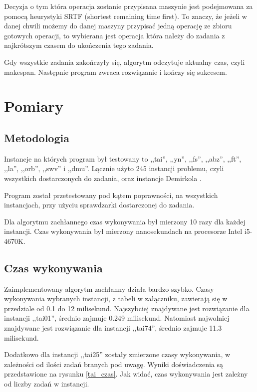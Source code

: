 \documentclass[11pt,twocolumn]{article}
\begin{document}
Decyzja o tym która operacja zostanie przypisana maszynie jest podejmowana za pomocą heurystyki SRTF
(shortest remaining time first). To znaczy, że jeżeli w danej chwili możemy do danej maszyny
przypisać jedną operację ze zbioru gotowych operacji, to wybierana jest operacja
która należy do zadania z najkrótszym czasem do ukończenia tego zadania.

Gdy wszystkie zadania zakończyły się, algorytm odczytuje aktualny czas,
czyli makespan. Następnie program zwraca rozwiązanie i kończy się sukcesem.


\section{Pomiary}

\subsection{Metodologia}

Instancje na których program był testowany to ,,tai'', ,,yn'', ,,fs'',
,,abz'', ,,ft'', ,,la'', ,,orb'', ,,swv'' i ,,dmu''.
Lącznie użyto 245 instancji problemu,
czyli wszystkich dostarczonych do zadania,
oraz instancje Demirkola \cite{bound}.

Program został przetestowany pod kątem poprawności,
na wszystkich instancjach,
przy użyciu sprawdzarki dostarczonej do zadania.

Dla algorytmu zachłannego czas wykonywania był mierzony 10 razy dla każdej instancji.
Czas wykonywania był mierzony nanosekundach na procesorze Intel i5-4670K.

\subsection{Czas wykonywania}

Zaimplementowany algorytm zachłanny działa bardzo szybko.
Czasy wykonywania wybranych instancji,
z tabeli w załączniku,
zawierają się w przedziale od 0.1 do 12 milisekund.
Najszybciej znajdywane jest rozwiązanie dla instancji ,,tai01'',
średnio zajmuje 0.249 milisekund.
Natomiast najwolniej znajdywane jest rozwiązanie dla instancji ,,tai74'',
średnio zajmuje 11.3 milisekund.

Dodatkowo dla instancji ,,tai25'' zostały zmierzone czasy wykonywania,
w zależności od ilości zadań branych pod uwagę.
Wyniki doświadczenia są przedstawione na rysunku \ref{tai_czas}.
Jak widać, czas wykonywania jest zależny od liczby zadań w instancji.
\end{document}
